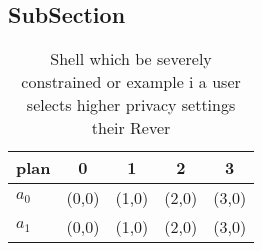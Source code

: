 \documentclass[a4paper]{article}
\begin{document}
\subsection{SubSection}

\begin{table}
\begin{adjustbox}{width=0.5\columnwidth}
\begin{tabular}{|l|l|l|l|l|}
\hline
\textbf{plan} & \multicolumn{1}{c|}{\textbf{0}} & \multicolumn{1}{c|}{\textbf{1}} & \multicolumn{1}{c|}{\textbf{2}} & \multicolumn{1}{c|}{\textbf{3}} \\ \hline
\textbf{$a_0$}  & (0,0) & (1,0) & (2,0) & (3,0) \\ \hline
\textbf{$a_1$}  & (0,0) & (1,0) & (2,0) & (3,0) \\ \hline
\end{tabular}
\end{adjustbox}
\caption{Shell which be severely constrained or example i a user selects higher privacy settings their Rever
}
\end{table}
\end{document}
